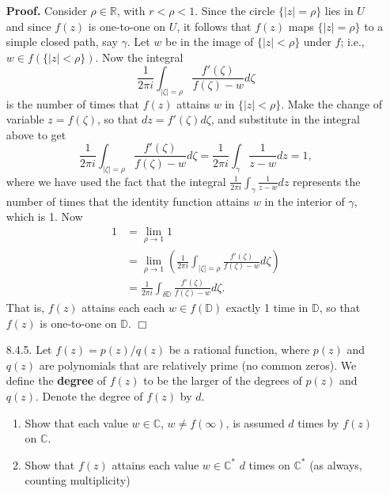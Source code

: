 \documentclass[9pt]{article}
\newcommand{\qed}{\hfill \ensuremath{\Box}}
\newcommand{\R}{\mathbb{R}}
\newcommand{\C}{\mathbb{C}}
\begin{document}
\begin{enumerate}
      \textbf{Proof.} Consider $\rho \in \R$, with $r < \rho < 1$. Since the
      circle $\{|z| = \rho\}$ lies in $U$ and since $f(z)$ is one-to-one on $U$,
      it follows that $f(z)$ maps $\{|z| = \rho\}$ to a simple closed path, say
      $\gamma$. Let $w$ be in the image of $\{|z| < \rho\}$ under $f$; i.e.,
      $w \in f(\{|z| < \rho\})$. Now the integral
      $$\frac{1}{2\pi i}\int_{|\zeta| = \rho}
        \frac{f'(\zeta)}{f(\zeta) - w}d\zeta$$
      is the number of times that $f(z)$ attains $w$ in $\{|z| < \rho\}$. Make
      the change of variable $z = f(\zeta)$, so that $dz = f'(\zeta)d\zeta$, and
      substitute in the integral above to get
      $$\frac{1}{2\pi i}\int_{|\zeta| = \rho}
        \frac{f'(\zeta)}{f(\zeta) - w}d\zeta = \frac{1}{2\pi i}\int_\gamma
        \frac{1}{z - w}dz = 1,$$
      where we have used the fact that the integral
      $\frac{1}{2\pi i}\int_\gamma\frac{1}{z - w}dz$ represents the number of
      times that the identity function attains $w$ in the interior of $\gamma$,
      which is 1. Now
      \begin{align*}
         1 &= \lim_{\rho \rightarrow 1}1 \\
         &= \lim_{\rho \rightarrow 1}\left(\frac{1}{2\pi i}\int_{|\zeta| = \rho}
        \frac{f'(\zeta)}{f(\zeta) - w}d\zeta\right) \\
         &= \frac{1}{2\pi i}\int_{\delta \mathbb{D}}
        \frac{f'(\zeta)}{f(\zeta) - w}d\zeta.
      \end{align*}
      That is, $f(z)$ attains each each $w \in f(\mathbb{D})$ exactly 1 time in
      $\mathbb{D}$, so that $f(z)$ is one-to-one on $\mathbb{D}$. \qed
   \item[8.4.5.]  Let $f(z) = p(z)/q(z)$ be a rational function, where $p(z)$
                  and $q(z)$ are polynomials that are relatively prime (no
                  common zeros). We define the \textbf{degree} of $f(z)$ to be
                  the larger of the degrees of $p(z)$ and $q(z)$. Denote the
                  degree of $f(z)$ by $d$.
                  \begin{enumerate}
                     \item Show that each value $w \in \C$, $w \neq f(\infty)$,
                           is assumed $d$ times by $f(z)$ on $\C$.
                     \item Show that $f(z)$ attains each value $w \in \C^*$ $d$
                           times on $\C^*$ (as always, counting multiplicity)
                  \end{enumerate}
             

\end{enumerate}
\end{document}
